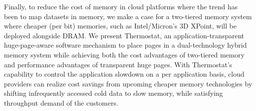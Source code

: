 Finally, to reduce the cost of memory in cloud platforms where the trend has
been to map datasets in memory, we make a case for a two-tiered memory system
where cheaper (per bit) memories, such as Intel/Micron’s 3D XPoint, will be deployed alongside DRAM. We present
Thermostat, an application-transparent huge-page-aware
software mechanism to place pages in a dual-technology hybrid memory system
while
achieving both the cost advantages of two-tiered memory and performance
advantages of transparent huge pages. With Thermostat's capability to control
the application slowdown on a per application basis, cloud providers can realize
cost savings from upcoming
cheaper memory technologies by shifting infrequently accessed cold data to slow
memory, while satisfying throughput demand of the customers.

